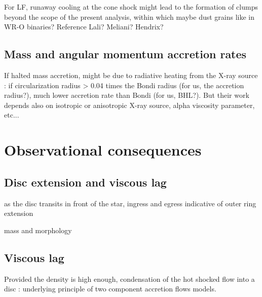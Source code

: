 \documentclass{aa}
\begin{document}
For LF, runaway cooling at the cone shock might lead to the formation of clumps beyond the scope of the present analysis, within which maybe dust grains like in WR-O binaries? Reference Lali? Meliani? Hendrix?


\subsection{Mass and angular momentum accretion rates}
\label{sec:mdot_ldot}

If halted mass accretion, might be due to radiative heating from the X-ray source \citep{Sugimura2018} : if circularization radius > 0.04 times the Bondi radius (for us, the accretion radius?), much lower accretion rate than Bondi (for us, BHL?). But their work depends also on isotropic or anisotropic X-ray source, alpha viscosity parameter, etc...

\section{Observational consequences}
\label{sec:obs_cons}

\subsection{Disc extension and viscous lag}
\label{sec:rout}

as the disc transits in front of the star, ingress and egress indicative of outer ring extension

mass and morphology

\subsection{Viscous lag}
\label{sec:visc}

Provided the density is high enough, condensation of the hot shocked flow into a disc \citep[][and references therein]{Taam2018} : underlying principle of two component accretion flows models.
\end{document}
